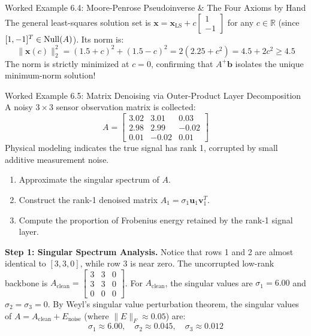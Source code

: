 \begin{examplebox}[breakable]{Worked Example 6.4: Moore-Penrose Pseudoinverse \& The Four Axioms by Hand}
\begin{equation}
\end{equation}
The general least-squares solution set is $\mathbf{x} = \mathbf{x}_{\text{LS}} + c \begin{bmatrix} 1 \\ -1 \end{bmatrix}$ for any $c \in \mathbb{R}$ (since $[1, -1]^T \in \operatorname{Null}(A)$).
Its norm is:
\begin{equation}
\|\mathbf{x}(c)\|_2^2 = (1.5 + c)^2 + (1.5 - c)^2 = 2(2.25 + c^2) = 4.5 + 2c^2 \ge 4.5
\end{equation}
The norm is strictly minimized at $c = 0$, confirming that $A^+ \mathbf{b}$ isolates the unique minimum-norm solution!
\end{examplebox}

\begin{examplebox}[breakable]{Worked Example 6.5: Matrix Denoising via Outer-Product Layer Decomposition}
A noisy $3 \times 3$ sensor observation matrix is collected:
\begin{equation}
A = \begin{bmatrix} 3.02 & 3.01 & 0.03 \\ 2.98 & 2.99 & -0.02 \\ 0.01 & -0.02 & 0.01 \end{bmatrix}
\end{equation}
Physical modeling indicates the true signal has rank 1, corrupted by small additive measurement noise.
\begin{enumerate}
    \item Approximate the singular spectrum of $A$.
    \item Construct the rank-1 denoised matrix $A_1 = \sigma_1 \mathbf{u}_1 \mathbf{v}_1^T$.
    \item Compute the proportion of Frobenius energy retained by the rank-1 signal layer.
\end{enumerate}

\textbf{Step 1: Singular Spectrum Analysis.}
Notice that rows 1 and 2 are almost identical to $[3, 3, 0]$, while row 3 is near zero.
The uncorrupted low-rank backbone is $A_{\text{clean}} = \begin{bmatrix} 3 & 3 & 0 \\ 3 & 3 & 0 \\ 0 & 0 & 0 \end{bmatrix}$.
For $A_{\text{clean}}$, the singular values are $\sigma_1 = 6.00$ and $\sigma_2 = \sigma_3 = 0$.
By Weyl's singular value perturbation theorem, the singular values of $A = A_{\text{clean}} + E_{\text{noise}}$ (where $\|E\|_F \approx 0.05$) are:
\begin{equation}
\sigma_1 \approx 6.00, \quad \sigma_2 \approx 0.045, \quad \sigma_3 \approx 0.012
\end{equation}


\end{examplebox}
